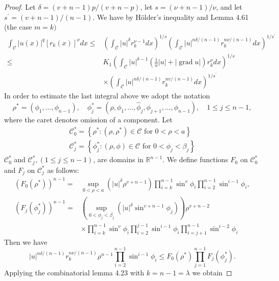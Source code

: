 \begin{proof}
  Let $\delta=(v+n-1) p /(v+n-p)$, let $s=(\nu+n-1) / \nu$, and let $s^{\prime}=(v+n-1) /(n-1)$. We have by Hölder's inequality and Lemma 4.61 (the case $m=k)$
  \[
  \begin{aligned}
  \int_{\mathcal{C}}|u(x)|^q\left[r_k(x)\right]^\nu d x \leq & \left(\int_{\mathcal{C}}|u|^\delta r_k^{\nu-1} d x\right)^{1 / s}\left(\int_{\mathcal{C}}|u|^{n \delta /(n-1)} r_k^{n \nu /(n-1)} d x\right)^{1 / s^{\prime}} \\
  \leq & K_1\left(\int_{\mathcal{C}}|u|^{\delta-1}\left(\frac{1}{a}|u|+|\operatorname{grad} u|\right) r_k^\nu d x\right)^{1 / s} \\
  & \times\left(\int_{\mathcal{C}}|u|^{n \delta /(n-1)} r_k^{n v /(n-1)} d x\right)^{1 / s^{\prime}}
  \end{aligned}
  \]
  In order to estimate the last integral above we adopt the notation
  \[
  \rho^*=\left(\phi_1, \ldots, \phi_{n-1}\right), \quad \phi_j^*=\left(\rho, \phi_1, \ldots, \hat{\phi}_j, \phi_{j+1}, \ldots, \phi_{n-1}\right), \quad 1 \leq j \leq n-1,
  \]
  where the caret denotes omission of a component. Let
  \[
  \begin{gathered}
  \mathcal{C}_0^*=\left\{\rho^*:\left(\rho, \rho^*\right) \in \mathcal{C} \text { for } 0<\rho<a\right\} \\
  \mathcal{C}_j^*=\left\{\phi_j^*:(\rho, \phi) \in \mathcal{C} \text { for } 0<\phi_j<\beta_j\right\}
  \end{gathered}
  \]
  $\mathcal{C}_0^*$ and $\mathcal{C}_j^*,(1 \leq j \leq n-1)$, are domains in $\mathbb{R}^{n-1}$. We define functions $F_0$ on $\mathcal{C}_0^*$ and $F_j$ on $\mathcal{C}_j^*$ as follows:
  \[
  \begin{aligned}
  \left(F_0\left(\rho^*\right)\right)^{n-1}= & \sup _{0<\rho<a}\left(|u|^\delta \rho^{v+n-1}\right) \prod_{i=k}^{n-1} \sin ^v \phi_i \prod_{i=2}^{n-1} \sin ^{i-1} \phi_i, \\
  \left(F_j\left(\phi_j^*\right)\right)^{n-1}= & \left(\sup _{0<\phi_j<\beta_j}\left(|u|^\delta \sin ^{v+n-1} \phi_j\right)\right) \rho^{v+n-2} \\
  & \times \prod_{i=k}^{n-1} \sin ^v \phi_i \prod_{i=2}^{j-1} \sin ^{i-1} \phi_i \prod_{i=j+1}^{n-1} \sin ^{i-2} \phi_i
  \end{aligned}
  \]
  Then we have
  \[
  |u|^{n \delta /(n-1)} r_k^{n \nu /(n-1)} \rho^{n-1} \prod_{i=2}^{n-1} \sin ^{i-1} \phi_i \leq F_0\left(\rho^*\right) \prod_{j=1}^{n-1} F_j\left(\phi_j^*\right) .
  \]
  Applying the combinatorial lemma 4.23 with $k=n-1=\lambda$ we obtain

\end{proof}
